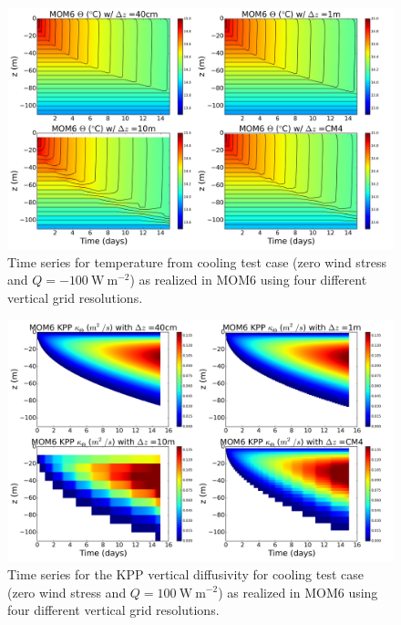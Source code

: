 \begin{figure}[h!t]
\begin{center}
\includegraphics[angle=0,width=14cm]{./figs/MOM6/cooling_KPP_MOM6_temp.png}
\caption[Temperature from MOM6 for cooling test]{\sf Time series for
  temperature from cooling test case (zero wind stress and
  $Q=-100~\mbox{W}~\mbox{m}^{-2}$) as realized in MOM6 using four
  different vertical grid resolutions.}
\label{fig:MOM6_temp-cooling}
\end{center}
\end{figure}


\begin{figure}[h!t]
\begin{center}
\includegraphics[angle=0,width=14cm]{./figs/MOM6/cooling_KPP_MOM6_KPP_diffusivity.png}
\caption[KPP diffusivity from MOM6 for cooling test]{\sf Time series
  for the KPP vertical diffusivity for cooling test case (zero wind
  stress and $Q=100~\mbox{W}~\mbox{m}^{-2}$) as realized in MOM6 using
  four different vertical grid resolutions.}
\label{fig:MOM6_KPP_diffusivity-cooling}
\end{center}
\end{figure}


